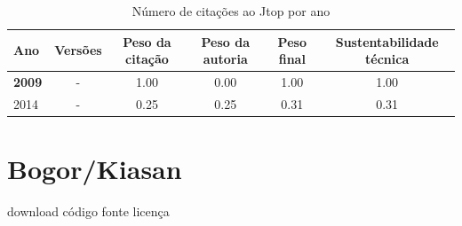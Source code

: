 \begin{table}[H]
\caption{Número de citações ao Jtop por ano}
\centering
\begin{tabular}{| l | c | c | c | c | c |}
  \hline
  Ano & Versões & Peso da citação & Peso da autoria & Peso final & Sustentabilidade técnica \\
  \hline
            {\bf 2009}
          &
          -
          &
          1.00
          &
          0.00
          &
          1.00
          &
            {\color{blue} 1.00}
          \\
\hline
            2014
          &
          -
          &
          0.25
          &
          0.25
          &
          0.31
          &
            {\color{red} 0.31}
          \\
\hline
\end{tabular}
\end{table}



\section{Bogor/Kiasan}
\checkmark download
\checkmark código fonte
\checkmark licença


